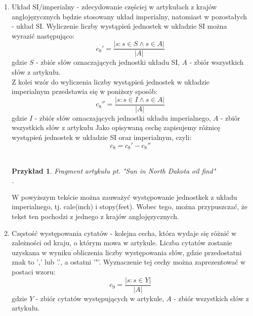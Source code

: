 \documentclass{classrep}
\newtheorem{exmp}{Przykład}[section]
\begin{document}
\begin{enumerate}
    \item Układ SI/imperialny - zdecydowanie częściej w artykułach z krajów anglojęzycznych będzie stosowany układ imperialny, natomiast w pozostałych - układ SI. 
    Wyliczenie liczby wystąpień jednostek w układzie SI można wyrazić następująco: 
     \begin{equation}
        c_8' = \frac{|{s: s \in S \land s \in A}|}{|A|}
    \end{equation}
    gdzie $S$ - zbiór słów oznaczających jednostki układu SI, $A$ - zbiór wszystkich słów z artykułu. \\
    Z kolei wzór do wyliczenia liczby wystąpień jednostek w układzie imperialnym przedstawia się w poniższy sposób:
    \begin{equation}
        c_8'' = \frac{|{s: s \in I \land s \in A}|}{|A|}
    \end{equation}
    gdzie $I$ - zbiór słów oznaczających jednostki układu imperialnego, $A$ - zbiór wszystkich słów z artykułu
    Jako opisywaną cechę zapisujemy różnicę wystąpień jednostek w układzie SI oraz imperialnym, czyli:
    \begin{equation}
        c_8 = {c_8'}-{c_8''}
    \end{equation} \\
    \begin{exmp}Fragment artykułu pt. "Sun in North Dakota oil find" \cite{reuters} \\
    . \\
    \end{exmp}
    W powyższym tekście można zauważyć występowanie jednostkek z układu imperialnego, tj. cale(inch) i stopy(feet). Wobec tego, można przypuszczać, że tekst ten pochodzi z jednego z krajów anglojęzycznych. \\
    \item Częstość występowania cytatów - 
     kolejna cecha, która wydaje się różnić w zależności od kraju, o którym mowa w artykule. Liczba cytatów zostanie uzyskana w wyniku obliczenia liczby występowania słów, gdzie przedostatni znak to ',' lub '.', a ostatni '"'. Wyznaczenie  tej  cechy  można zaprezentować w postaci wzoru:
    \begin{equation}
        c_9 = \frac{|{s: s \in Y}|}{|A|}
    \end{equation}
    gdzie $Y$ - zbiór cytatów występujących w artykule, $A$ - zbiór wszystkich słów z artykułu. \\

\end{enumerate}
\end{document}
